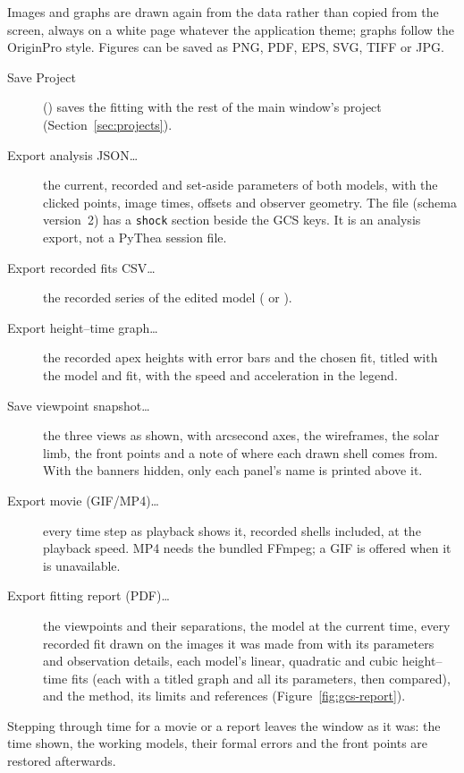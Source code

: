 Images and graphs are drawn again from the data rather than copied from the screen, always on
a white page whatever the application theme; graphs follow the OriginPro style. Figures can be
saved as PNG, PDF, EPS, SVG, TIFF or JPG.
\begin{description}
  \item[Save Project] () saves the fitting with the rest of the main window's
    project (Section~\ref{sec:projects}).
  \item[Export analysis JSON…] the current, recorded and set-aside
    parameters of both models, with the clicked points, image times, offsets and observer
    geometry. The file (schema version~2) has a \texttt{shock} section beside the GCS keys. It
    is an analysis export, not a PyThea session file.
  \item[Export recorded fits CSV…] the recorded series of the edited model
    ( or ).
  \item[Export height–time graph…] the recorded apex heights with error bars and the chosen
    fit, titled with the model and fit, with the speed and acceleration in the legend.
  \item[Save viewpoint snapshot…] the three views as shown, with arcsecond axes, the
    wireframes, the solar limb, the front points and a note of where each drawn shell comes
    from. With the banners hidden, only each panel's name is printed above it.
  \item[Export movie (GIF/MP4)…] every time step as playback shows it, recorded shells
    included, at the playback speed. MP4 needs the bundled FFmpeg; a GIF is offered when it is
    unavailable.
  \item[Export fitting report (PDF)…] the viewpoints and their separations, the model at the
    current time, every recorded fit drawn on the images it was made from with its parameters
    and observation details, each model's linear, quadratic and cubic height--time fits (each
    with a titled graph and all its parameters, then compared), and the method, its limits and
    references (Figure~\ref{fig:gcs-report}).
\end{description}
Stepping through time for a movie or a report leaves the window as it was: the time shown, the
working models, their formal errors and the front points are restored afterwards.


